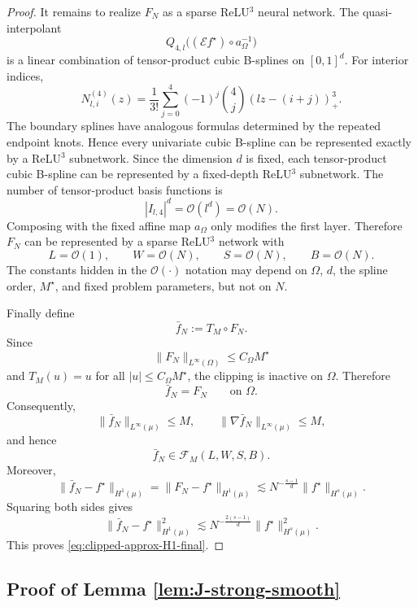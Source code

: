 \documentclass[11pt]{article}
\theoremstyle{plain}
\theoremstyle{definition}
\theoremstyle{remark}
\begin{document}
\begin{proof}
It remains to realize \(F_N\) as a sparse ReLU\(^3\) neural network. The
quasi-interpolant
\[
Q_{4,l}\bigl((\mathcal E f^\star)\circ a_\Omega^{-1}\bigr)
\]
is a linear combination of tensor-product cubic B-splines on \([0,1]^d\).
For interior indices,
\[
N_{l,i}^{(4)}(z)
=
\frac{1}{3!}
\sum_{j=0}^{4}
(-1)^j
\binom{4}{j}
\left(lz-(i+j)\right)_+^3 .
\]
The boundary splines have analogous formulas determined by the repeated
endpoint knots. Hence every univariate cubic B-spline can be represented
exactly by a ReLU\(^3\) subnetwork. Since the dimension \(d\) is fixed,
each tensor-product cubic B-spline can be represented by a fixed-depth
ReLU\(^3\) subnetwork. The number of tensor-product basis functions is
\[
|I_{l,4}|^d=\mathcal O(l^d)=\mathcal O(N).
\]
Composing with the fixed affine map \(a_\Omega\) only modifies the first layer.
Therefore \(F_N\) can be represented by a sparse ReLU\(^3\) network with
\[
L=\mathcal O(1),
\qquad
W=\mathcal O(N),
\qquad
S=\mathcal O(N),
\qquad
B=\mathcal O(N).
\]
The constants hidden in the \(\mathcal O(\cdot)\) notation may depend on
\(\Omega\), \(d\), the spline order, \(M^\star\), and fixed problem
parameters, but not on \(N\).

Finally define
\[
\bar f_N:=T_M\circ F_N .
\]
Since
\[
\|F_N\|_{L^\infty(\Omega)}\le C_\Omega M^\star
\]
and \(T_M(u)=u\) for all \(|u|\le C_\Omega M^\star\), the clipping is inactive
on \(\Omega\). Therefore
\[
\bar f_N=F_N
\qquad\text{on }\Omega .
\]
Consequently,
\[
\|\bar f_N\|_{L^\infty(\mu)}\le M,
\qquad
\|\nabla \bar f_N\|_{L^\infty(\mu)}\le M,
\]
and hence
\[
\bar f_N\in\mathcal F_M(L,W,S,B).
\]
Moreover,
\[
\|\bar f_N-f^\star\|_{H^1(\mu)}
=
\|F_N-f^\star\|_{H^1(\mu)}
\lesssim
N^{-\frac{s-1}{d}}
\|f^\star\|_{H^s(\mu)}.
\]
Squaring both sides gives
\[
\|\bar f_N-f^\star\|_{H^1(\mu)}^2
\lesssim
N^{-\frac{2(s-1)}{d}}
\|f^\star\|_{H^s(\mu)}^2 .
\]
This proves \eqref{eq:clipped-approx-H1-final}.
\end{proof}







\subsection{Proof of Lemma \ref{lem:J-strong-smooth}}
\end{document}
